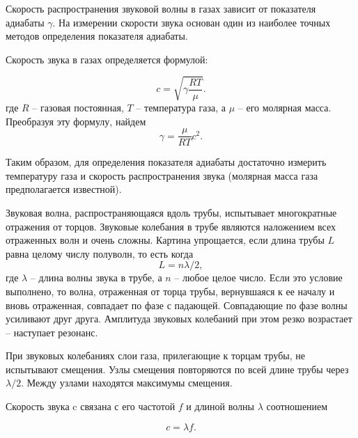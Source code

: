 \documentclass[12pt,a4paper]{article}
\begin{document}
Скорость распространения звуковой волны в газах зависит от показателя адиабаты $ \gamma $. На измерении скорости звука основан один из наиболее точных методов определения показателя адиабаты.

Скорость звука в газах определяется формулой:

\begin{equation}\label{velocity}
c=\sqrt{\gamma\frac{RT}{\mu}}.
\end{equation}
где $ R $ -- газовая постоянная, $ T $ -- температура газа, а $ \mu $ -- его молярная масса. Преобразуя эту формулу, найдем
\begin{equation}\label{gamma}
\boxed{\gamma = \frac{\mu}{RT}c^2}.
\end{equation}

Таким образом, для определения показателя адиабаты достаточно измерить температуру газа и скорость распространения звука (молярная масса газа предполагается известной).

Звуковая волна, распространяющаяся вдоль трубы, испытывает многократные отражения от торцов. Звуковые колебания в трубе являются наложением всех отраженных волн и очень сложны. Картина упрощается, если длина трубы $ L $ равна целому числу полуволн, то есть когда \[ L=n\lambda/2, \] где $ \lambda $ -- длина волны звука в трубе, а $ n $ -- любое целое число. Если это условие выполнено, то волна, отраженная от торца трубы, вернувшаяся к ее началу и вновь отраженная, совпадает по фазе с падающей. Совпадающие по фазе волны усиливают друг друга. Амплитуда звуковых колебаний при этом резко возрастает -- наступает резонанс.

При звуковых колебаниях слои газа, прилегающие к торцам трубы, не испытывают смещения. Узлы смещения повторяются по всей длине трубы через $ \lambda/2 $. Между узлами находятся максимумы смещения.

Скорость звука c связана с его частотой $ f $ и длиной волны $ \lambda $ соотношением

\begin{equation}\label{lambda_f}
c=\lambda f.
\end{equation}
\end{document}
